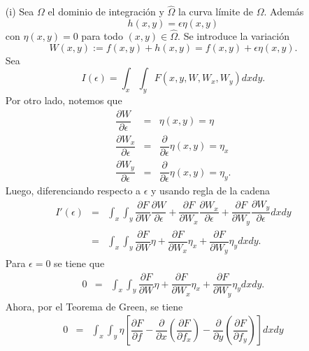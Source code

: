 \documentclass[11pt,letterpaper]{article}
\theoremstyle{definition}
\theoremstyle{definition}
\theoremstyle{definition}
\begin{document}
\begin{itemize}
	\item[(i)] Sea $ \Omega $ el dominio de integración y $ \hat{\Omega} $ la curva límite de $ \Omega $. Además 
\begin{equation*}
	h(x,y) = \epsilon \eta (x, y)
\end{equation*}
con $ \eta(x, y) = 0 $ para todo $ (x,y) \in \hat{\Omega} $. Se introduce la variación
\begin{equation*}
	W(x,y) := f(x,y) + h(x,y) = f(x, y) + \epsilon \eta(x,y). 
\end{equation*}
Sea
\begin{equation}
	I(\epsilon) = \int_x \int_y F(x, y, W, W_x, W_y) dx dy.
\end{equation}
Por otro lado, notemos que
\begin{eqnarray*}
	\dfrac{\partial W}{\partial \epsilon} & = & \eta(x,y) = \eta \\
	\dfrac{\partial W_x}{\partial \epsilon} & = & 	\dfrac{\partial}{\partial \epsilon}\eta(x,y)  = \eta_x \\
	\dfrac{\partial W_y}{\partial \epsilon} & = & 	\dfrac{\partial}{\partial \epsilon}\eta(x,y) = \eta_y.
\end{eqnarray*}
Luego, diferenciando respecto a $ \epsilon $ y usando regla de la cadena
\small{\begin{eqnarray*}
	I'(\epsilon) & = & \int_x \int_y \dfrac{\partial F}{\partial W}\dfrac{\partial W}{\partial \epsilon} + \dfrac{\partial F}{\partial W_x}\dfrac{\partial W_x}{\partial \epsilon}  + \dfrac{\partial F}{\partial W_y}\dfrac{\partial W_y}{\partial \epsilon} dx dy \\
	             & = & \int_x \int_y \dfrac{\partial F}{\partial W}\eta + \dfrac{\partial F}{\partial W_x}\eta_x  + \dfrac{\partial F}{\partial W_y}\eta_y dx dy.
\end{eqnarray*}}
Para $ \epsilon = 0 $ se tiene que
\begin{eqnarray*}
	0 & = & \int_x \int_y \dfrac{\partial F}{\partial W}\eta + \dfrac{\partial F}{\partial W_x}\eta_x  + \dfrac{\partial F}{\partial W_y}\eta_y dx dy.
\end{eqnarray*}
Ahora, por el Teorema de Green, se tiene 
\begin{eqnarray*}
	0 & = & \int_x \int_y \eta \left[ \dfrac{\partial F}{\partial f} - \dfrac{\partial}{\partial x} \left( \dfrac{\partial F}{\partial f_x} \right)  - \dfrac{\partial}{\partial y} \left( \dfrac{\partial F}{\partial f_y} \right) \right] dx dy \\

\end{eqnarray*}
\end{itemize}
\end{document}
